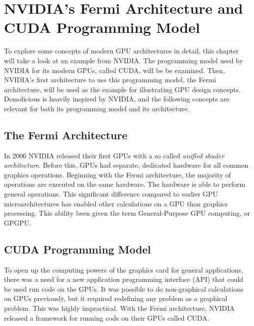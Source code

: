 \documentclass[../main/report.tex]{subfiles}
\begin{document}
\chapter{NVIDIA's Fermi Architecture and CUDA Programming Model}
\label{sec:fermi}


To explore some concepts of modern GPU architectures in detail, this chapter will take a look at an example from NVIDIA.
The programming model used by NVIDIA for its modern GPUs, called CUDA, will be be examined.
Then, NVIDIA's first architecture to use this programming model, the Fermi architecture, will be used as the example for illustrating GPU design concepts.  
Demolicious is heavily inspired by NVIDIA, and the following concepts are relevant for both its programming model and its architecture.


\section{The Fermi Architecture}

In 2006 NVIDIA released their first GPUs with a so called \emph{unified shader architecture}.
Before this, GPUs had separate, dedicated hardware for all common graphics operations. 
Beginning with the Fermi architecture, the majority of operations are executed on the same hardware.
The hardware is able to perform general operations.
This significant difference compared to earlier GPU microarchitectures has enabled other calculations on a GPU than graphics processing.
This ability been given the term General-Purpose GPU computing, or GPGPU.


\section{CUDA Programming Model}
\label{sec:cuda_prog_model}

To open up the computing powers of the graphics card for general applications, there was a need for a new application programming interface (API) that could be used run code on the GPUs.
It was possible to do non-graphical calculations on GPUs previously, but it required redefining any problem as a graphical problem.
This was highly impractical. 
With the Fermi architecture, NVIDIA released a framework for running code on their GPUs called CUDA.
\end{document}
